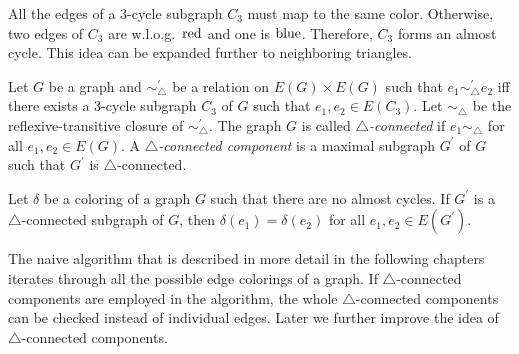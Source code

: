 All the edges of a 3-cycle subgraph \( C_3 \) must map to the same color.
Otherwise, two edges of \( C_3 \) are w.l.o.g.\ \( \text{red} \) and one is \( \text{blue} \).
Therefore, \( C_3 \) forms an almost cycle.
This idea can be expanded further to neighboring triangles.
%
\begin{definition}
	Let \( G \) be a graph and \( \sim^\prime_\triangle \) be
	a relation on \( E(G) \times E(G) \) such that \( e_1 \sim^\prime_\triangle e_2 \)
	iff there exists a 3-cycle subgraph \( C_3 \) of \( G \)
	such that \( e_1, e_2 \in E(C_3) \).
	Let \( \sim_\triangle \) be the reflexive-transitive closure of \( \sim^\prime_\triangle \).
	The graph \( G \) is called \emph{\( \triangle \)-connected} if \( e_1 \sim_\triangle \)
	for all \( e_1, e_2 \in E(G) \).
	A \emph{\( \triangle \)-connected component} is a maximal subgraph \( G^\prime \) of \( G \) such
	that \( G^\prime \) is \( \triangle \)-connected.
\end{definition}
%
\begin{lemma}
	Let \( \delta \) be a coloring of a graph \( G \) such that there are
	no almost cycles. If \( G^\prime \) is
	a \( \triangle \)-connected subgraph of \( G \),
	then \( \delta(e_1) = \delta(e_2) \) for all \( e_1, e_2 \in E(G^\prime) \).
\end{lemma}
%
The naive algorithm that is described in more detail in the following chapters
iterates through all the possible edge colorings of a graph.
If \( \triangle \)-connected components are employed in the algorithm,
the whole \( \triangle \)-connected components can be checked instead of individual edges.
Later we further improve the idea of \( \triangle \)-connected components.

